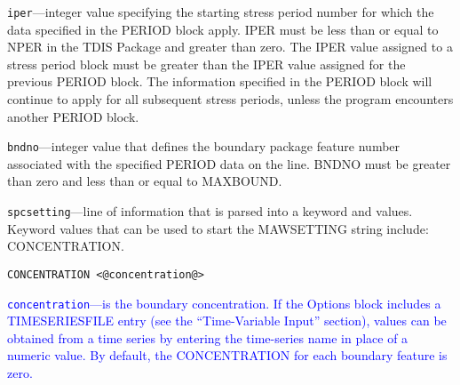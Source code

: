 \begin{description}
\item \texttt{iper}---integer value specifying the starting stress period number for which the data specified in the PERIOD block apply.  IPER must be less than or equal to NPER in the TDIS Package and greater than zero.  The IPER value assigned to a stress period block must be greater than the IPER value assigned for the previous PERIOD block.  The information specified in the PERIOD block will continue to apply for all subsequent stress periods, unless the program encounters another PERIOD block.

\item \texttt{bndno}---integer value that defines the boundary package feature number associated with the specified PERIOD data on the line. BNDNO must be greater than zero and less than or equal to MAXBOUND.

\item \texttt{spcsetting}---line of information that is parsed into a keyword and values.  Keyword values that can be used to start the MAWSETTING string include: CONCENTRATION.

\begin{lstlisting}[style=blockdefinition]
CONCENTRATION <@concentration@>
\end{lstlisting}

\item \textcolor{blue}{\texttt{concentration}---is the boundary concentration. If the Options block includes a TIMESERIESFILE entry (see the ``Time-Variable Input'' section), values can be obtained from a time series by entering the time-series name in place of a numeric value. By default, the CONCENTRATION for each boundary feature is zero.}

\end{description}

